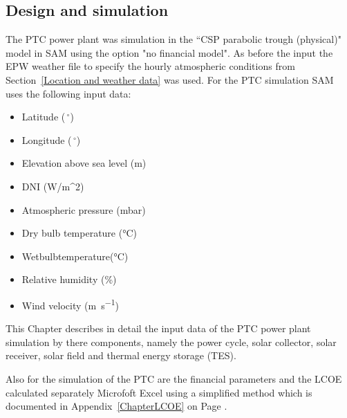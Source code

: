 \subsection{Design  and simulation} \label{PTC power plant design  and simulation}
The PTC power plant was simulation in the “CSP parabolic trough (physical)" model in SAM using the option "no financial model". As before the input the EPW weather file to specify the hourly atmospheric conditions from Section~\ref{Location and weather data} was used. For the PTC simulation SAM uses the following input data:
\begin{itemize}
\item Latitude ($\,^{\circ}$)
\item Longitude ($\,^{\circ}$)
\item Elevation above sea level (m)
\item DNI (W/m^2)
\item Atmospheric pressure (mbar)
\item Dry bulb temperature (\si{\celsius})
\item Wetbulbtemperature(\si{\celsius})
\item Relative humidity (\si{\percent})
\item Wind velocity (\si{\metre\per\second})
\end{itemize}
This Chapter describes in detail the input data of the PTC power plant simulation by there components, namely the  power cycle, solar collector, solar receiver, solar field and thermal energy storage (TES).

Also for the simulation of the PTC are the financial parameters and the LCOE calculated separately Microfoft Excel using a simplified method which is documented in Appendix~\ref{ChapterLCOE} on Page \pageref{ChapterLCOE}.
